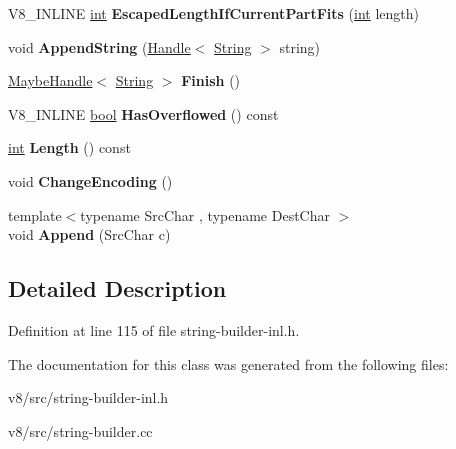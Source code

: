 \begin{DoxyCompactItemize}
\item 
\mbox{\label{classv8_1_1internal_1_1IncrementalStringBuilder_a84025ff9047d568247e9730dfad46904}} 
V8\+\_\+\+I\+N\+L\+I\+NE \mbox{\hyperlink{classint}{int}} {\bfseries Escaped\+Length\+If\+Current\+Part\+Fits} (\mbox{\hyperlink{classint}{int}} length)
\item 
\mbox{\label{classv8_1_1internal_1_1IncrementalStringBuilder_ac052d667b4362b4a8187b2bc41c5d624}} 
void {\bfseries Append\+String} (\mbox{\hyperlink{classv8_1_1internal_1_1Handle}{Handle}}$<$ \mbox{\hyperlink{classv8_1_1internal_1_1String}{String}} $>$ string)
\item 
\mbox{\label{classv8_1_1internal_1_1IncrementalStringBuilder_a0abca58c430ebdda0937a26c580040f5}} 
\mbox{\hyperlink{classv8_1_1internal_1_1MaybeHandle}{Maybe\+Handle}}$<$ \mbox{\hyperlink{classv8_1_1internal_1_1String}{String}} $>$ {\bfseries Finish} ()
\item 
\mbox{\label{classv8_1_1internal_1_1IncrementalStringBuilder_a9a7ddc433947f9a4c6576979dc2ec3d1}} 
V8\+\_\+\+I\+N\+L\+I\+NE \mbox{\hyperlink{classbool}{bool}} {\bfseries Has\+Overflowed} () const
\item 
\mbox{\label{classv8_1_1internal_1_1IncrementalStringBuilder_a5a21b6b1c4c3dbfdbe3a8bf94fefde53}} 
\mbox{\hyperlink{classint}{int}} {\bfseries Length} () const
\item 
\mbox{\label{classv8_1_1internal_1_1IncrementalStringBuilder_a0b8605c2f8efbc2a7b84092ae95b462a}} 
void {\bfseries Change\+Encoding} ()
\item 
\mbox{\label{classv8_1_1internal_1_1IncrementalStringBuilder_a465683659aeb8bd3e1ab285787eaa53a}} 
{\footnotesize template$<$typename Src\+Char , typename Dest\+Char $>$ }\\void {\bfseries Append} (Src\+Char c)
\end{DoxyCompactItemize}


\subsection{Detailed Description}


Definition at line 115 of file string-\/builder-\/inl.\+h.



The documentation for this class was generated from the following files\+:\begin{DoxyCompactItemize}
\item 
v8/src/string-\/builder-\/inl.\+h\item 
v8/src/string-\/builder.\+cc\end{DoxyCompactItemize}
